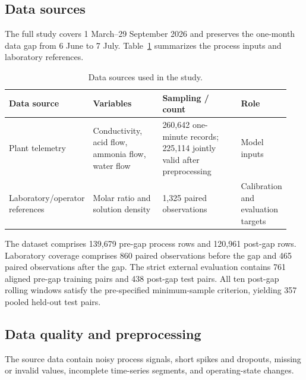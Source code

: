 \documentclass[preprint,12pt,authoryear]{elsarticle}
\begin{document}
\subsection{Data sources}

The full study covers 1 March--29 September 2026 and preserves the one-month data gap from 6 June to 7 July. Table~\ref{tab:data} summarizes the process inputs and laboratory references.

\begin{table}[!ht]
\centering
\caption{Data sources used in the study.}
\label{tab:data}
\small
\begin{tabular}{@{}p{0.19\linewidth}p{0.27\linewidth}p{0.32\linewidth}p{0.16\linewidth}@{}}
\toprule
\textbf{Data source} & \textbf{Variables} & \textbf{Sampling / count} & \textbf{Role} \\
\midrule
Plant telemetry &
Conductivity, acid flow, ammonia flow, water flow &
260,642 one-minute records; 225,114 jointly valid after preprocessing &
Model inputs \\
Laboratory/operator references &
Molar ratio and solution density &
1,325 paired observations &
Calibration and evaluation targets \\
\bottomrule
\end{tabular}
\end{table}

The dataset comprises 139,679 pre-gap process rows and 120,961 post-gap rows. Laboratory coverage comprises 860 paired observations before the gap and 465 paired observations after the gap. The strict external evaluation contains 761 aligned pre-gap training pairs and 438 post-gap test pairs. All ten post-gap rolling windows satisfy the pre-specified minimum-sample criterion, yielding 357 pooled held-out test pairs.

\subsection{Data quality and preprocessing}

The source data contain noisy process signals, short spikes and dropouts, missing or invalid values, incomplete time-series segments, and operating-state changes. 
\end{document}
